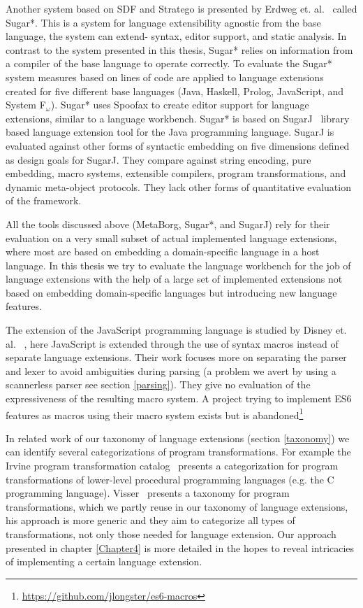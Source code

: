 Another system based on SDF and Stratego is presented by Erdweg et. al.~\cite{Erdweg} called Sugar*. This is a system for language extensibility agnostic from the base language, the system can extend- syntax, editor support, and static analysis. In contrast to the system presented in this thesis, Sugar* relies on information from a compiler of the base language to operate correctly. To evaluate the Sugar* system measures based on lines of code are applied to language extensions created for five different base languages (Java, Haskell, Prolog, JavaScript, and System F$_{\omega}$). Sugar* uses Spoofax to create editor support for language extensions, similar to a language workbench. Sugar* is based on SugarJ~\cite{Erdweg2011} library based language extension tool for the Java programming language. SugarJ is evaluated against other forms of syntactic embedding on five dimensions defined as design goals for SugarJ. They compare against string encoding, pure embedding, macro systems, extensible compilers, program transformations, and dynamic meta-object protocols. They lack other forms of quantitative evaluation of the framework.

All the tools discussed above (MetaBorg, Sugar*, and SugarJ) rely for their evaluation on a very small subset of actual implemented language extensions, where most are based on embedding a domain-specific language in a host language. In this thesis we try to evaluate the language workbench for the job of language extensions with the help of a large set of implemented extensions not based on embedding domain-specific languages but introducing new language features.  

The extension of the JavaScript programming language is studied by Disney et. al. ~\cite{Disney2014}, here JavaScript is extended through the use of syntax macros instead of separate language extensions. Their work focuses more on separating the parser and lexer to avoid ambiguities during parsing (a problem we avert by using a scannerless parser see section \ref{parsing}). They give no evaluation of the expressiveness of the resulting macro system. A project trying to implement ES6 features as macros using their macro system exists but is abandoned\footnote{\url{https://github.com/jlongster/es6-macros}}

In related work of our taxonomy of language extensions (section \ref{taxonomy}) we can identify several categorizations of program transformations. For example the Irvine program transformation catalog~\cite{Standish1976a} presents a categorization for program transformations of lower-level procedural programming languages (e.g. the C programming language). Visser~\cite{Visser2001} presents a taxonomy for program transformations, which we partly reuse in our taxonomy of language extensions, his approach is more generic and they aim to categorize all types of transformations, not only those needed for language extension. Our approach presented in chapter \ref{Chapter4} is more detailed in the hopes to reveal intricacies of implementing a certain language extension.


